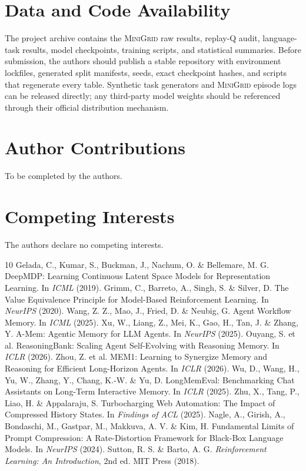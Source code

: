\documentclass[11pt]{article}
\newcommand{\minigrid}{\textsc{MiniGrid}}
\begin{document}
\section{Data and Code Availability}
The project archive contains the \minigrid{} raw results, replay-Q audit, language-task results, model checkpoints, training scripts, and statistical summaries. Before submission, the authors should publish a stable repository with environment lockfiles, generated split manifests, seeds, exact checkpoint hashes, and scripts that regenerate every table. Synthetic task generators and \minigrid{} episode logs can be released directly; any third-party model weights should be referenced through their official distribution mechanism.

\section{Author Contributions}
To be completed by the authors.

\section{Competing Interests}
The authors declare no competing interests.

\begin{thebibliography}{10}
Gelada, C., Kumar, S., Buckman, J., Nachum, O. \& Bellemare, M. G. DeepMDP: Learning Continuous Latent Space Models for Representation Learning. In \emph{ICML} (2019).
Grimm, C., Barreto, A., Singh, S. \& Silver, D. The Value Equivalence Principle for Model-Based Reinforcement Learning. In \emph{NeurIPS} (2020).
Wang, Z. Z., Mao, J., Fried, D. \& Neubig, G. Agent Workflow Memory. In \emph{ICML} (2025).
Xu, W., Liang, Z., Mei, K., Gao, H., Tan, J. \& Zhang, Y. A-Mem: Agentic Memory for LLM Agents. In \emph{NeurIPS} (2025).
Ouyang, S. et al. ReasoningBank: Scaling Agent Self-Evolving with Reasoning Memory. In \emph{ICLR} (2026).
Zhou, Z. et al. MEM1: Learning to Synergize Memory and Reasoning for Efficient Long-Horizon Agents. In \emph{ICLR} (2026).
Wu, D., Wang, H., Yu, W., Zhang, Y., Chang, K.-W. \& Yu, D. LongMemEval: Benchmarking Chat Assistants on Long-Term Interactive Memory. In \emph{ICLR} (2025).
Zhu, X., Tang, P., Liao, H. \& Appalaraju, S. Turbocharging Web Automation: The Impact of Compressed History States. In \emph{Findings of ACL} (2025).
Nagle, A., Girish, A., Bondaschi, M., Gastpar, M., Makkuva, A. V. \& Kim, H. Fundamental Limits of Prompt Compression: A Rate-Distortion Framework for Black-Box Language Models. In \emph{NeurIPS} (2024).
Sutton, R. S. \& Barto, A. G. \emph{Reinforcement Learning: An Introduction}, 2nd ed. MIT Press (2018).
\end{thebibliography}
\end{document}
